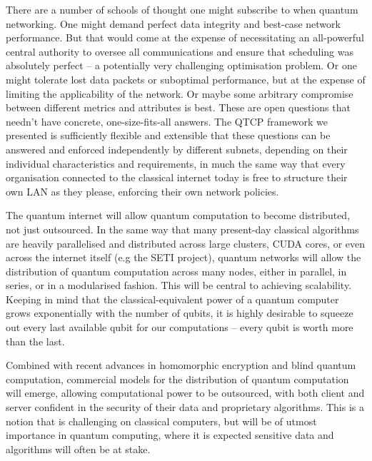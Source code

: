 \documentclass[aps,rmp,twocolumn,amsmath,amssymb,nofootinbib,superscriptaddress,longbibliography,floatfix]{revtex4-1}
\begin{document}
There are a number of schools of thought one might subscribe to when quantum networking. One might demand perfect data integrity and best-case network performance. But that would come at the expense of necessitating an all-powerful central authority to oversee all communications and ensure that scheduling was absolutely perfect -- a potentially very challenging optimisation problem. Or one might tolerate lost data packets or suboptimal performance, but at the expense of limiting the applicability of the network. Or maybe some arbitrary compromise between different metrics and attributes is best. These are open questions that needn't have concrete, one-size-fits-all answers. The QTCP framework we presented is sufficiently flexible and extensible that these questions can be answered and enforced independently by different subnets, depending on their individual characteristics and requirements, in much the same way that every organisation connected to the classical internet today is free to structure their own LAN as they please, enforcing their own network policies.

The quantum internet will allow quantum computation to become distributed, not just outsourced. In the same way that many present-day classical algorithms are heavily parallelised and distributed across large clusters, CUDA cores, or even across the internet itself (e.g the SETI project), quantum networks will allow the distribution of quantum computation across many nodes, either in parallel, in series, or in a modularised fashion. This will be central to achieving scalability. Keeping in mind that the classical-equivalent power of a quantum computer grows exponentially with the number of qubits, it is highly desirable to squeeze out every last available qubit for our computations -- every qubit is worth more than the last.

Combined with recent advances in homomorphic encryption and blind quantum computation, commercial models for the distribution of quantum computation will emerge, allowing computational power to be outsourced, with both client and server confident in the security of their data and proprietary algorithms. This is a notion that is challenging on classical computers, but will be of utmost importance in quantum computing, where it is expected sensitive data and algorithms will often be at stake.
\end{document}
